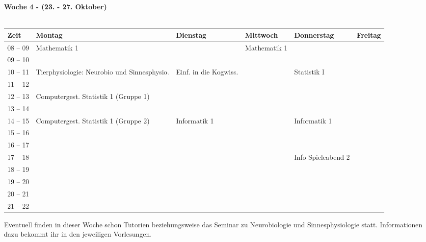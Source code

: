 \vfil
\textbf{Woche 4 - (23. - 27. Oktober)}\\
\\
\begin{tabular}{|l|p{}|p{}|p{}|p{}|p{}|} \hline
	Zeit & Montag & Dienstag & Mittwoch & Donnerstag & Freitag \\ 
	\hline \hline
 08 -- 09 & \footnotesize{Mathematik 1} & & \footnotesize{Mathematik 1} & & \\ \cline{1-1}
 09 -- 10 & & & & & \\ \cline{1-5}
 10 -- 11 & \footnotesize{Tierphysiologie: Neurobio und Sinnesphysio.} & \footnotesize{Einf. in die Kogwiss.} & & \footnotesize{Statistik I} & \\ \cline{1-1} 
 11 -- 12 &  &  & &  & \\ \hline
 12 -- 13 & \footnotesize{Computergest. Statistik 1 (Gruppe 1)}& & & & \\ \cline{1-1}
 13 -- 14 & & & & & \\ \hline
 14 -- 15 & \footnotesize{Computergest. Statistik 1 (Gruppe 2)} & \footnotesize{Informatik 1} & & \footnotesize{Informatik 1} & \\  \cline {1-1}
 15 -- 16 & &  & & & \\ \hline
 16 -- 17 & &  & & & \\ \cline{1-1}
 17 -- 18 & & & & \scriptsize{Info Spieleabend 2} \cellcolor{lightlightgray}& \\ \cline{1-1} \cline{4-4} \cline{6-6}
 18 -- 19 & & & & \cellcolor{lightlightgray}& \\ \cline{1-1}
 19 -- 20 & & & & \cellcolor{lightlightgray} & \\ \cline{1-1} \cline{6-6}
 20 -- 21 & & & &  \cellcolor{lightlightgray}& \\ \cline{1-1}
 21 -- 22 & & & &  \cellcolor{lightlightgray}& \\ \hline
\end{tabular}


\footnotesize{Eventuell finden in dieser Woche schon Tutorien beziehungsweise das Seminar zu Neurobiologie und Sinnesphysiologie statt. Informationen dazu bekommt ihr in den jeweiligen Vorlesungen.}
\normalsize
\newpage
